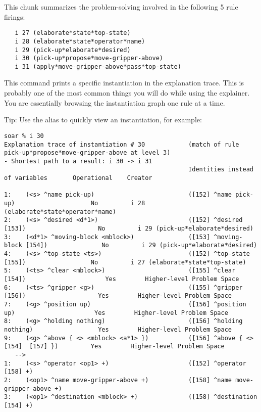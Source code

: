 This chunk summarizes the problem-solving involved in the following 5
rule firings:

\begin{verbatim}
   i 27 (elaborate*state*top-state)
   i 28 (elaborate*state*operator*name)
   i 29 (pick-up*elaborate*desired)
   i 30 (pick-up*propose*move-gripper-above)
   i 31 (apply*move-gripper-above*pass*top-state)
\end{verbatim}

\textbf{}

This command prints a specific instantiation in the explanation trace.  This is probably one of the most common things you will do while using the explainer. You are essentially browsing the instantiation graph one rule at a time.

Tip: Use the alias  to quickly view an instantiation, for example:

{\tiny
\begin{verbatim}
soar % i 30
Explanation trace of instantiation # 30            (match of rule pick-up*propose*move-gripper-above at level 3)
- Shortest path to a result: i 30 -> i 31
                                                   Identities instead of variables       Operational    Creator

1:    (<s> ^name pick-up)                          ([152] ^name pick-up)                     No         i 28 (elaborate*state*operator*name)
2:    (<s> ^desired <d*1>)                         ([152] ^desired [153])                    No         i 29 (pick-up*elaborate*desired)
3:    (<d*1> ^moving-block <mblock>)               ([153] ^moving-block [154])               No         i 29 (pick-up*elaborate*desired)
4:    (<s> ^top-state <ts>)                        ([152] ^top-state [155])                  No         i 27 (elaborate*state*top-state)
5:    (<ts> ^clear <mblock>)                       ([155] ^clear [154])                      Yes        Higher-level Problem Space
6:    (<ts> ^gripper <g>)                          ([155] ^gripper [156])                    Yes        Higher-level Problem Space
7:    (<g> ^position up)                           ([156] ^position up)                      Yes        Higher-level Problem Space
8:    (<g> ^holding nothing)                       ([156] ^holding nothing)                  Yes        Higher-level Problem Space
9:    (<g> ^above { <> <mblock> <a*1> })           ([156] ^above { <>[154]  [157] })         Yes        Higher-level Problem Space
   -->
1:    (<s> ^operator <op1> +)                      ([152] ^operator [158] +)
2:    (<op1> ^name move-gripper-above +)           ([158] ^name move-gripper-above +)
3:    (<op1> ^destination <mblock> +)              ([158] ^destination [154] +)
\end{verbatim}
}

